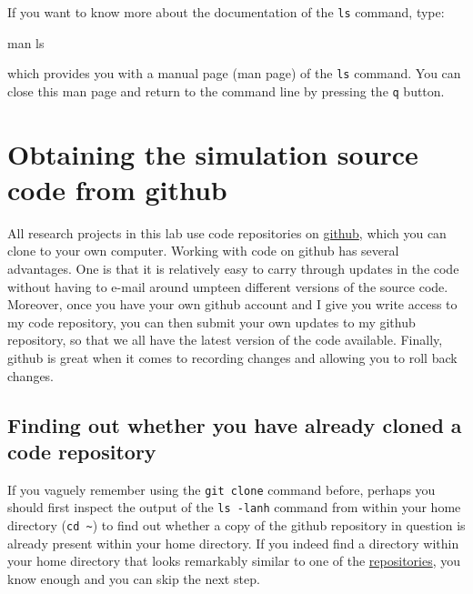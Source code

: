 \documentclass[
]{book}
\newenvironment{Shaded}{\begin{snugshade}}{\end{snugshade}}
\newcommand{\FunctionTok}[1]{\textcolor[rgb]{0.00,0.00,0.00}{#1}}
\newcommand{\NormalTok}[1]{#1}
\begin{document}
If you want to know more about the documentation of the \texttt{ls} command, type:

\begin{Shaded}
\begin{Highlighting}[]
\FunctionTok{man}\NormalTok{ ls}
\end{Highlighting}
\end{Shaded}

which provides you with a manual page (man page) of the \texttt{ls} command. You can close this man page and return to the command line by pressing the \texttt{q} button.

\hypertarget{obtaining-the-simulation-source-code-from-github}{%
\section{Obtaining the simulation source code from github}\label{obtaining-the-simulation-source-code-from-github}}

All research projects in this lab use code repositories on \href{https://github.com/bramkuijper}{github}, which you can clone to your own computer. Working with code on github has several advantages. One is that it is relatively easy to carry through updates in the code without having to e-mail around umpteen different versions of the source code. Moreover, once you have your own github account and I give you write access to my code repository, you can then submit your own updates to my github repository, so that we all have the latest version of the code available. Finally, github is great when it comes to recording changes and allowing you to roll back changes.

\hypertarget{finding-out-whether-you-have-already-cloned-a-code-repository}{%
\subsection{Finding out whether you have already cloned a code repository}\label{finding-out-whether-you-have-already-cloned-a-code-repository}}

If you vaguely remember using the \texttt{git\ clone} command before, perhaps you should first inspect the output of the \texttt{ls\ -lanh} command from within your home directory (\texttt{cd\ \textasciitilde{}}) to find out whether a copy of the github repository in question is already present within your home directory. If you indeed find a directory within your home directory that looks remarkably similar to one of the \href{https://github.com/bramkuijper?tab=repositories}{repositories}, you know enough and you can skip the next step.
\end{document}
